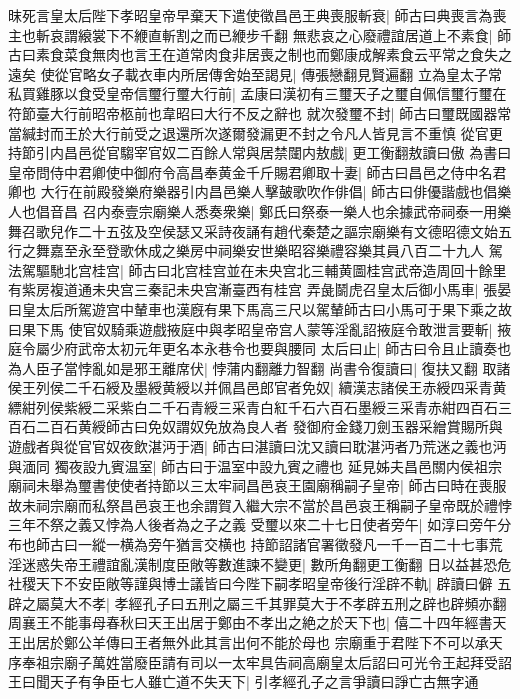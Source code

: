 昩死言皇太后陛下孝昭皇帝早棄天下遣使徵昌邑王典喪服斬衰|{
	師古曰典喪言為喪主也斬哀謂縗裳下不緶直斬割之而已緶步千翻}
無悲哀之心廢禮誼居道上不素食|{
	師古曰素食菜食無肉也言王在道常肉食非居喪之制也而鄭康成解素食云平常之食失之遠矣}
使從官略女子載衣車内所居傳舍始至謁見|{
	傳張戀翻見賢遍翻}
立為皇太子常私買雞豚以食受皇帝信璽行璽大行前|{
	孟康曰漢初有三璽天子之璽自佩信璽行璽在符節臺大行前昭帝柩前也韋昭曰大行不反之辭也}
就次發璽不封|{
	師古曰璽既國器常當緘封而王於大行前受之退還所次遂爾發漏更不封之令凡人皆見言不重慎}
從官更持節引内昌邑從官騶宰官奴二百餘人常與居禁闥内敖戲|{
	更工衡翻敖讀曰傲}
為書曰皇帝問侍中君卿使中御府令高昌奉黄金千斤賜君卿取十妻|{
	師古曰昌邑之侍中名君卿也}
大行在前殿發樂府樂器引内昌邑樂人擊皷歌吹作俳倡|{
	師古曰俳優諧戲也倡樂人也倡音昌}
召内泰壹宗廟樂人悉奏衆樂|{
	鄭氏曰祭泰一樂人也余據武帝祠泰一用樂舞召歌兒作二十五弦及空侯瑟又采詩夜誦有趙代秦楚之謳宗廟樂有文德昭德文始五行之舞嘉至永至登歌休成之樂房中祠樂安世樂昭容樂禮容樂其員八百二十九人}
駕法駕驅馳北宫桂宫|{
	師古曰北宫桂宫並在未央宫北三輔黄圖桂宫武帝造周回十餘里有紫房複道通未央宫三秦記未央宫漸臺西有桂宫}
弄彘鬬虎召皇太后御小馬車|{
	張晏曰皇太后所駕遊宫中輦車也漢廐有果下馬高三尺以駕輦師古曰小馬可于果下乘之故曰果下馬}
使官奴騎乘遊戲掖庭中與孝昭皇帝宫人蒙等淫亂詔掖庭令敢泄言要斬|{
	掖庭令屬少府武帝太初元年更名本永巷令也要與腰同}
太后曰止|{
	師古曰令且止讀奏也}
為人臣子當悖亂如是邪王離席伏|{
	悖蒲内翻離力智翻}
尚書令復讀曰|{
	復扶又翻}
取諸侯王列侯二千石綬及墨綬黄綬以并佩昌邑郎官者免奴|{
	續漢志諸侯王赤綬四采青黄縹紺列侯紫綬二采紫白二千石青綬三采青白紅千石六百石墨綬三采青赤紺四百石三百石二百石黄綬師古曰免奴謂奴免放為良人者}
發御府金錢刀劍玉器采繒賞賜所與遊戲者與從官官奴夜飲湛沔于酒|{
	師古曰湛讀曰沈又讀曰耽湛沔者乃荒迷之義也沔與湎同}
獨夜設九賓温室|{
	師古曰于温室中設九賓之禮也}
延見姊夫昌邑關内侯祖宗廟祠未舉為璽書使使者持節以三太牢祠昌邑哀王園廟稱嗣子皇帝|{
	師古曰時在喪服故未祠宗廟而私祭昌邑哀王也余謂賀入繼大宗不當於昌邑哀王稱嗣子皇帝既於禮悖三年不祭之義又悖為人後者為之子之義}
受璽以來二十七日使者旁午|{
	如淳曰旁午分布也師古曰一縱一横為旁午猶言交横也}
持節詔諸官署徵發凡一千一百二十七事荒淫迷惑失帝王禮誼亂漢制度臣敞等數進諫不變更|{
	數所角翻更工衡翻}
日以益甚恐危社稷天下不安臣敞等謹與博士議皆曰今陛下嗣孝昭皇帝後行淫辟不軌|{
	辟讀曰僻}
五辟之屬莫大不孝|{
	孝經孔子曰五刑之屬三千其罪莫大于不孝辟五刑之辟也辟頻亦翻}
周襄王不能事母春秋曰天王出居于鄭由不孝出之絶之於天下也|{
	僖二十四年經書天王出居於鄭公羊傳曰王者無外此其言出何不能於母也}
宗廟重于君陛下不可以承天序奉祖宗廟子萬姓當廢臣請有司以一太牢具告祠高廟皇太后詔曰可光令王起拜受詔王曰聞天子有争臣七人雖亡道不失天下|{
	引孝經孔子之言爭讀曰諍亡古無字通}
